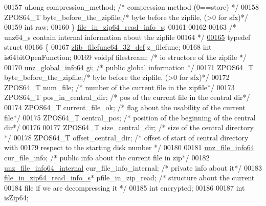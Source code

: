 \begin{DoxyCode}
00157     uLong compression\_method;   \textcolor{comment}{/* compression method (0==store) */}
00158     ZPOS64\_T byte\_before\_the\_zipfile;\textcolor{comment}{/* byte before the zipfile, (>0 for sfx)*/}
00159     \textcolor{keywordtype}{int}   raw;
00160 \} \hyperlink{structfile__in__zip64__read__info__s}{file\_in\_zip64\_read\_info\_s};
00161 
00162 
00163 \textcolor{comment}{/* unz64\_s contain internal information about the zipfile}
00164 \textcolor{comment}{*/}
\hyperlink{structunz64__s}{00165} \textcolor{keyword}{typedef} \textcolor{keyword}{struct}
00166 \{
00167     \hyperlink{structzlib__filefunc64__32__def__s}{zlib\_filefunc64\_32\_def} z\_filefunc;
00168     \textcolor{keywordtype}{int} is64bitOpenFunction;
00169     voidpf filestream;        \textcolor{comment}{/* io structore of the zipfile */}
00170     \hyperlink{structunz__global__info64__s}{unz\_global\_info64} gi;       \textcolor{comment}{/* public global information */}
00171     ZPOS64\_T byte\_before\_the\_zipfile;\textcolor{comment}{/* byte before the zipfile, (>0 for sfx)*/}
00172     ZPOS64\_T num\_file;             \textcolor{comment}{/* number of the current file in the zipfile*/}
00173     ZPOS64\_T pos\_in\_central\_dir;   \textcolor{comment}{/* pos of the current file in the central dir*/}
00174     ZPOS64\_T current\_file\_ok;      \textcolor{comment}{/* flag about the usability of the current file*/}
00175     ZPOS64\_T central\_pos;          \textcolor{comment}{/* position of the beginning of the central dir*/}
00176 
00177     ZPOS64\_T size\_central\_dir;     \textcolor{comment}{/* size of the central directory  */}
00178     ZPOS64\_T offset\_central\_dir;   \textcolor{comment}{/* offset of start of central directory with}
00179 \textcolor{comment}{                                   respect to the starting disk number */}
00180 
00181     \hyperlink{structunz__file__info64__s}{unz\_file\_info64} cur\_file\_info; \textcolor{comment}{/* public info about the current file in zip*/}
00182     \hyperlink{structunz__file__info64__internal__s}{unz\_file\_info64\_internal} cur\_file\_info\_internal; \textcolor{comment}{/* private info about it*/}
00183     \hyperlink{structfile__in__zip64__read__info__s}{file\_in\_zip64\_read\_info\_s}* pfile\_in\_zip\_read; \textcolor{comment}{/* structure about the current}
00184 \textcolor{comment}{                                        file if we are decompressing it */}
00185     \textcolor{keywordtype}{int} encrypted;
00186 
00187     \textcolor{keywordtype}{int} isZip64;

\end{DoxyCode}
